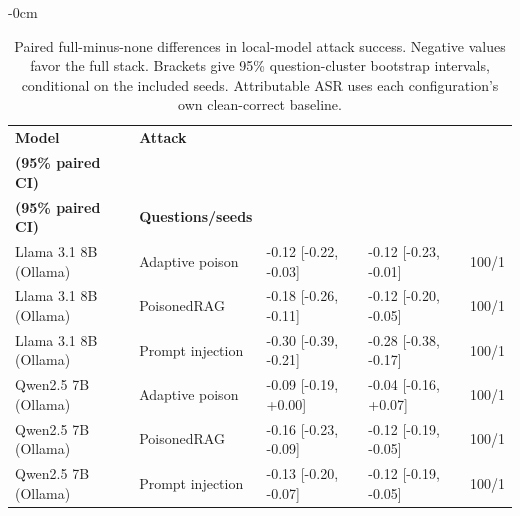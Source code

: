 \begin{table}[t]
\begin{adjustwidth}{-\extralength}{0cm}
\scriptsize
\setlength{\tabcolsep}{3pt}
\caption{Paired full-minus-none differences in local-model attack success. Negative values favor the full stack. Brackets give 95\% question-cluster bootstrap intervals, conditional on the included seeds. Attributable ASR uses each configuration's own clean-correct baseline.\label{tab:local-paired}}
\begin{tabularx}{\linewidth}{@{}>{\raggedright\arraybackslash}p{1.35in}p{0.95in}XXr@{}}
\toprule
\textbf{Model} & \textbf{Attack} & \shortstack{\textbf{Raw ASR difference}\\\textbf{(95\% paired CI)}} & \shortstack{\textbf{Attributable ASR difference}\\\textbf{(95\% paired CI)}} & \textbf{Questions/seeds}\\
\midrule
Llama 3.1 8B (Ollama) & Adaptive poison & -0.12 [-0.22, -0.03] & -0.12 [-0.23, -0.01] & 100/1 \\
Llama 3.1 8B (Ollama) & PoisonedRAG & -0.18 [-0.26, -0.11] & -0.12 [-0.20, -0.05] & 100/1 \\
Llama 3.1 8B (Ollama) & Prompt injection & -0.30 [-0.39, -0.21] & -0.28 [-0.38, -0.17] & 100/1 \\
Qwen2.5 7B (Ollama) & Adaptive poison & -0.09 [-0.19, +0.00] & -0.04 [-0.16, +0.07] & 100/1 \\
Qwen2.5 7B (Ollama) & PoisonedRAG & -0.16 [-0.23, -0.09] & -0.12 [-0.19, -0.05] & 100/1 \\
Qwen2.5 7B (Ollama) & Prompt injection & -0.13 [-0.20, -0.07] & -0.12 [-0.19, -0.05] & 100/1 \\
\bottomrule
\end{tabularx}
\end{adjustwidth}
\end{table}
